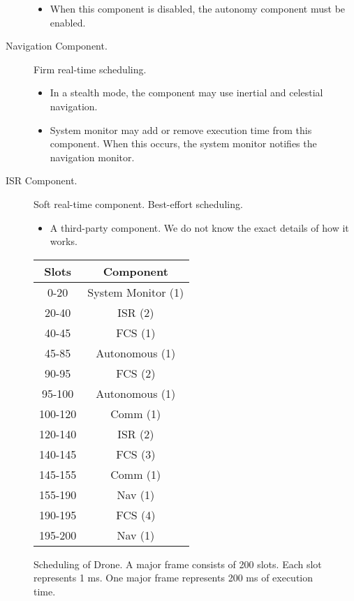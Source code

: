 \begin{description}
\begin{itemize}
			\item When this component is disabled, the autonomy component must be enabled.
		\end{itemize}
	\item[Navigation Component.] Firm real-time scheduling.
		\begin{itemize}
			\item In a stealth mode, the component may use inertial and celestial navigation.
			\item System monitor may add or remove execution time from this component. When this occurs, the system monitor notifies the navigation monitor.
		\end{itemize}
	\item [ISR Component.] Soft real-time component. Best-effort scheduling.
		\begin{itemize}
			\item A third-party component. We do not know the exact details of how it works.
		\end{itemize}
\end{description}

\begin{figure}
	\centering
	\begin{tabular}{c | c }
		Slots & Component \\\hline
		0-20 & System Monitor (1) \\
		20-40 & ISR (2) \\
		40-45 & FCS (1) \\
		45-85 & Autonomous (1) \\
		90-95 & FCS (2) \\
		95-100 & Autonomous (1) \\
		100-120 & Comm (1) \\
		120-140 & ISR (2) \\
		140-145 & FCS (3) \\
		145-155 & Comm (1) \\
		155-190 & Nav (1) \\
		190-195 & FCS (4) \\
		195-200 & Nav (1) \\
	\end{tabular}
	\caption{Scheduling of Drone. A major frame consists of 200 slots. Each slot represents 1 ms. One major frame represents 200 ms of execution time.}
\end{figure}
